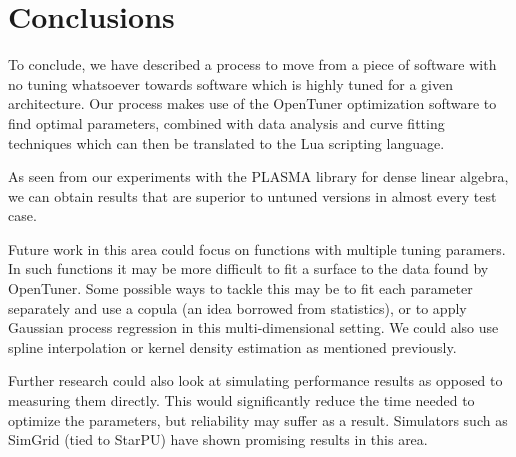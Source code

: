 \documentclass[a4paper,12pt]{article}
\begin{document}
\section{Conclusions}
\label{sec.conclusions}
To conclude,
we have described a process to move from a
piece of software with no tuning whatsoever
towards software which is highly tuned for a given architecture.
Our process makes use of the OpenTuner optimization
software to find optimal parameters,
combined with data analysis and curve fitting techniques
which can then be translated to the Lua scripting language.

As seen from our experiments with the PLASMA library
for dense linear algebra,
we can obtain results that are superior to untuned versions
in almost every test case.

Future work in this area could focus on functions with multiple
tuning paramers.
In such functions it may be more difficult
to fit a surface to the data found by OpenTuner.
Some possible ways to tackle this may be to fit
each parameter separately and use a copula
(an idea borrowed from statistics),
or to apply Gaussian process regression in this
multi-dimensional setting.
We could also use spline interpolation
or kernel density estimation as mentioned previously.

Further research could also look at simulating performance results
as opposed to measuring them directly.
This would significantly reduce the time needed to optimize
the parameters,
but reliability may suffer as a result.
Simulators such as SimGrid (tied to StarPU) have shown
promising results in this area.




\end{document}
